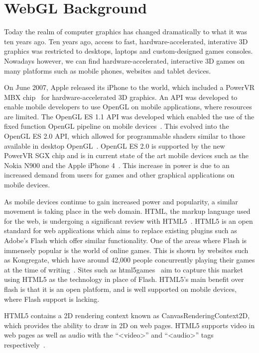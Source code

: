 \chapter{WebGL Background}
\label{ch:backgroundwebgl}
Today the realm of computer graphics has changed dramatically to what it was ten years ago.
Ten years ago, access to fast, hardware-accelerated, interative 3D graphics was restricted to desktops, laptops and custom-designed games consoles.
Nowadays however, we can find hardware-accelerated, interactive 3D games on many platforms such as mobile phones, websites and tablet devices.

On June 2007, Apple released its iPhone to the world, which included a PowerVR MBX chip~\cite{web:powervrmbx} for hardware-accelerated 3D graphics.
An API was developed to enable mobile developers to use OpenGL on mobile applications, where resources are limited.
The OpenGL ES 1.1 API was developed which enabled the use of the fixed function OpenGL pipeline on mobile devices~\cite{web:opengles11}.
This evolved into the OpenGL ES 2.0 API, which allowed for programmable shaders similar to those available in desktop OpenGL~\cite{web:opengles20}.
OpenGL ES 2.0 is supported by the new PowerVR SGX chip and is in current state of the art mobile devices such as the Nokia N900 and the Apple iPhone 4~\cite{web:powervrsgx}.
This increase in power is due to an increased demand from users for games and other graphical applications on mobile devices.

As mobile devices continue to gain increased power and popularity, a similar movement is taking place in the web domain.
HTML, the markup language used for the web, is undergoing a significant review with HTML5~\cite{web:html5}.
HTML5 is an open standard for web applications which aims to replace existing plugins such as Adobe's Flash which offer similar functionality.
One of the areas where Flash is immensely popular is the world of online games.
This is shown by websites such as Kongregate, which have around 42,000 people concurrently playing their games at the time of writing~\cite{web:kongregate}.
Sites such as html5games~\cite{web:html5games} aim to capture this market using HTML5 as the technology in place of Flash.
HTML5's main benefit over flash is that it is an open platform, and is well supported on mobile devices, where Flash support is lacking.

HTML5 contains a 2D rendering context known as CanvasRenderingContext2D, which provides the ability to draw in 2D on web pages.
HTML5 supports video in web pages as well as audio with the ``\textless video\textgreater'' and ``\textless audio\textgreater'' tags respectively~\cite{web:html5}.

